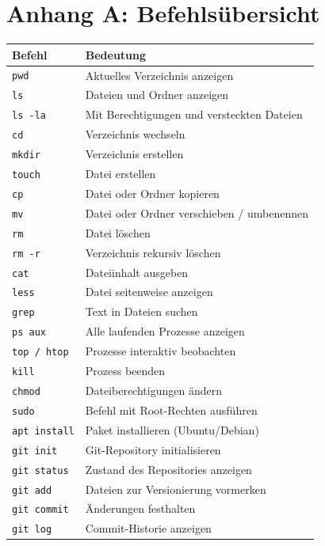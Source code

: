 \chapter{Anhang A: Befehlsübersicht}

\begin{tabularx}{\textwidth}{@{}lX@{}}
\toprule
\textbf{Befehl} & \textbf{Bedeutung} \\
\midrule
\texttt{pwd}        & Aktuelles Verzeichnis anzeigen \\
\texttt{ls}         & Dateien und Ordner anzeigen \\
\texttt{ls -la}     & Mit Berechtigungen und versteckten Dateien \\
\texttt{cd}         & Verzeichnis wechseln \\
\texttt{mkdir}      & Verzeichnis erstellen \\
\texttt{touch}      & Datei erstellen \\
\texttt{cp}         & Datei oder Ordner kopieren \\
\texttt{mv}         & Datei oder Ordner verschieben / umbenennen \\
\texttt{rm}         & Datei löschen \\
\texttt{rm -r}      & Verzeichnis rekursiv löschen \\
\texttt{cat}        & Dateiinhalt ausgeben \\
\texttt{less}       & Datei seitenweise anzeigen \\
\texttt{grep}       & Text in Dateien suchen \\
\texttt{ps aux}     & Alle laufenden Prozesse anzeigen \\
\texttt{top / htop} & Prozesse interaktiv beobachten \\
\texttt{kill}       & Prozess beenden \\
\texttt{chmod}      & Dateiberechtigungen ändern \\
\texttt{sudo}       & Befehl mit Root-Rechten ausführen \\
\texttt{apt install}& Paket installieren (Ubuntu/Debian) \\
\midrule
\texttt{git init}   & Git-Repository initialisieren \\
\texttt{git status} & Zustand des Repositories anzeigen \\
\texttt{git add}    & Dateien zur Versionierung vormerken \\
\texttt{git commit} & Änderungen festhalten \\
\texttt{git log}    & Commit-Historie anzeigen \\

\end{tabularx}
